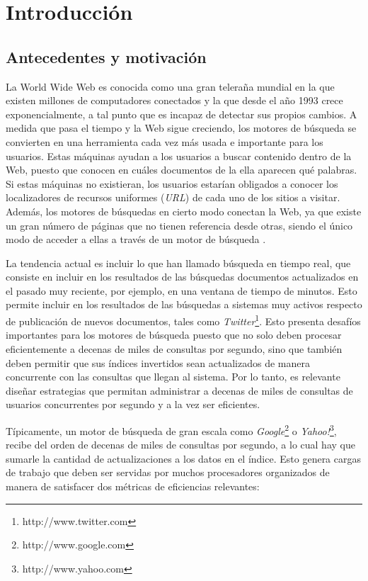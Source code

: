 \chapter{Introducci\'on}
\label{cap:intro}


\section{Antecedentes y motivaci\'on}
\label{intro:motivacion}
La World Wide Web es conocida como una gran teleraña mundial en la que existen millones de computadores conectados y la que desde el año 1993 crece exponencialmente, a tal punto que es incapaz de detectar sus propios cambios. A medida que pasa el tiempo y la Web sigue creciendo, los motores de búsqueda se convierten en una herramienta cada vez más usada e importante para los usuarios. Estas máquinas ayudan a los usuarios a buscar contenido dentro de la Web, puesto que conocen en cuáles documentos de la ella aparecen qué palabras. Si estas máquinas no existieran, los usuarios estarían obligados a conocer los localizadores de recursos uniformes (\textit{URL}) de cada uno de los sitios a visitar. Además, los motores de búsquedas en cierto modo conectan la Web, ya que existe un gran número de páginas que no tienen referencia desde otras, siendo el único modo de acceder a ellas a través de un motor de búsqueda \citep{Baeza-Yates:2008}.  

La tendencia actual es incluir lo que han llamado búsqueda en tiempo real, que consiste en incluir en los resultados de las búsquedas documentos actualizados en el pasado muy reciente, por ejemplo, en una ventana de tiempo de minutos. Esto permite incluir en los resultados de las búsquedas a sistemas muy activos respecto de publicación de nuevos documentos, tales como \textit{Twitter}\footnote{http://www.twitter.com}. Esto presenta desafíos importantes para los motores de búsqueda puesto que no solo deben procesar eficientemente a decenas de miles de consultas por segundo, sino que también deben permitir que sus índices invertidos \citep{Zobel:2006} sean actualizados de manera concurrente con las consultas que llegan al sistema. Por lo tanto, es relevante diseñar estrategias que permitan administrar a decenas de miles de consultas de usuarios concurrentes por segundo y a la vez ser eficientes.

Típicamente, un motor de búsqueda de gran escala como \textit{Google}\footnote{http://www.google.com} o \textit{Yahoo!}\footnote{http://www.yahoo.com}, recibe del orden de decenas de miles de consultas por segundo, a lo cual hay que sumarle la cantidad de actualizaciones a los datos en el índice. Esto genera cargas de trabajo que deben ser servidas por muchos procesadores organizados de manera de satisfacer dos métricas de eficiencias relevantes:

